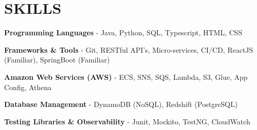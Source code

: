     \section{SKILLS}

        \begin{onecolentry}
            \textbf{Programming Languages} - Java, Python, SQL, Typescript, HTML, CSS
        \end{onecolentry}

        \vspace{0.1 cm}

        \begin{onecolentry}
            \textbf{Frameworks \& Tools} - Git, RESTful API's, Micro-services, CI/CD, ReactJS \small{(Familiar)}, SpringBoot  \small{(Familiar)} 
        \end{onecolentry}

        \vspace{0.1 cm}

        \begin{onecolentry}
            \textbf{Amazon Web Services (AWS)} - ECS, SNS, SQS, Lambda, S3, Glue, App Config, Athena
        \end{onecolentry}

        \vspace{0.1 cm}

        \begin{onecolentry}
            \textbf{Database Management}  - DynamoDB \small{(NoSQL)}, Redshift \small{(PostgreSQL)}
        \end{onecolentry}

        \vspace{0.1 cm}
        
        \begin{onecolentry}
            \textbf{Testing Libraries \& Observability}  - Junit, Mockito, TestNG, CloudWatch
        \end{onecolentry}